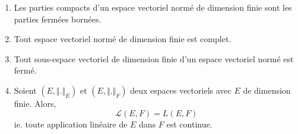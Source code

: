 	\begin{corollary}
		\label{autour-de-la-compacite-5}
		\begin{enumerate}[label=(\roman*)]
			\item \label{autour-de-la-compacite-5-1} Les parties compacts d'un espace vectoriel normé de dimension finie sont les parties fermées bornées.
			\item \label{autour-de-la-compacite-5-2} Tout espace vectoriel normé de dimension finie est complet.
			\item Tout sous-espace vectoriel de dimension finie d'un espace vectoriel normé est fermé.
			\item Soient $(E, \Vert . \Vert_E)$ et $(E, \Vert . \Vert_F)$ deux espaces vectoriels avec $E$ de dimension finie. Alors,
			\[ \mathcal{L}(E, F) = L(E,F) \]
			ie. toute application linéaire de $E$ dans $F$ est continue.
		\end{enumerate}
	\end{corollary}
	
